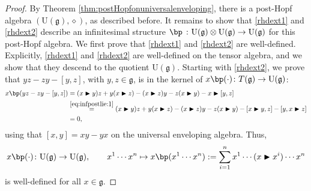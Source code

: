 \documentclass[10pt]{article}
\theoremstyle{definition}
\newcommand{\bt}{\blacktriangleright}
\renewcommand{\wp}{\diamond}
\begin{document}
\begin{proof}
By Theorem \ref{thm:postHopfonuniversalenveloping}, there is a post-Hopf algebra $(\mathrm{U}(\mathfrak{g}),\wp)$, as described before. It remains to show that \eqref{rhdext1} and \eqref{rhdext2} describe an infinitesimal structure $ \bp\ \colon \mathrm{U}(\mathfrak{g})\otimes \mathrm{U}(\mathfrak{g})\to \mathrm{U}(\mathfrak{g})$ for this post-Hopf algebra. We first prove that \eqref{rhdext1} and \eqref{rhdext2} are well-defined. Explicitly, \eqref{rhdext1} and \eqref{rhdext2} are well-defined on the tensor algebra, and we show that they descend to the quotient $\mathrm{U}(\mathfrak{g})$. Starting with \eqref{rhdext2}, we prove that $yz-zy-[y,z]$, with $y,z\in\mathfrak{g}$, is in the kernel of $x \bp(\cdot)\colon T(\mathfrak{g})\to \mathrm{U}(\mathfrak{g})$:
\begin{align*}
    x \bp(yz-zy-[y,z])
    &=(x\bt y)z+y(x\bt z)
    -(x\bt z)y-z(x\bt y)
    -x\bt[y,z]\\
    &\overset{\eqref{eq:infpostlie:1}}{=}(x\bt y)z+y(x\bt z)
    -(x\bt z)y-z(x\bt y)
    -[x\bt y,z]-[y,x\bt z]\\
    &=0,
\end{align*}
using that $[x,y]=xy-yx$ on the universal enveloping algebra. Thus,
\begin{equation}\label{Ugext2}
    x \bp(\cdot)\colon \mathrm{U}(\mathfrak{g})\to \mathrm{U}(\mathfrak{g}),\qquad
    x^1\cdots x^n\mapsto x \bp(x^1\cdots x^n):=\sum_{i=1}^nx^1\cdots(x\bt x^i)\cdots x^n
\end{equation}
is well-defined for all $x\in\mathfrak{g}$. 


\end{proof}
\end{document}
